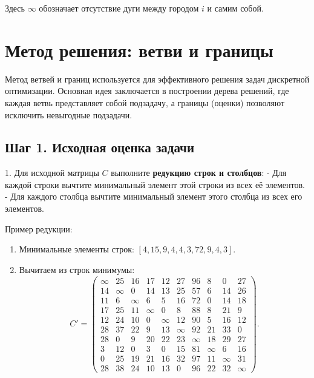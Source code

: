 \documentclass{article}
\begin{document}
Здесь $\infty$ обозначает отсутствие дуги между городом $i$ и самим собой.

\section*{Метод решения: ветви и границы}

Метод ветвей и границ используется для эффективного решения задач дискретной оптимизации. Основная идея заключается в построении дерева решений, где каждая ветвь представляет собой подзадачу, а границы (оценки) позволяют исключить невыгодные подзадачи.

\subsection*{Шаг 1. Исходная оценка задачи}

1. Для исходной матрицы $C$ выполните \textbf{редукцию строк и столбцов}:
- Для каждой строки вычтите минимальный элемент этой строки из всех её элементов.
- Для каждого столбца вычтите минимальный элемент этого столбца из всех его элементов.

Пример редукции:
\begin{enumerate}
    \item Минимальные элементы строк: $[4, 15, 9, 4, 4, 3, 72, 9, 4, 3]$.
    \item Вычитаем из строк минимумы:
          \[
              C' = \begin{pmatrix}
                  \infty & 25     & 16     & 17     & 12     & 27     & 96     & 8      & 0      & 27     \\
                  14     & \infty & 0      & 14     & 13     & 25     & 57     & 6      & 14     & 26     \\
                  11     & 6      & \infty & 6      & 5      & 16     & 72     & 0      & 14     & 18     \\
                  17     & 25     & 11     & \infty & 0      & 8      & 88     & 8      & 21     & 9      \\
                  12     & 24     & 10     & 0      & \infty & 12     & 90     & 5      & 16     & 12     \\
                  28     & 37     & 22     & 9      & 13     & \infty & 92     & 21     & 33     & 0      \\
                  28     & 0      & 9      & 20     & 22     & 23     & \infty & 18     & 29     & 27     \\
                  3      & 12     & 0      & 3      & 0      & 15     & 81     & \infty & 6      & 16     \\
                  0      & 25     & 19     & 21     & 16     & 32     & 97     & 11     & \infty & 31     \\
                  28     & 38     & 24     & 10     & 13     & 0      & 96     & 22     & 32     & \infty
              \end{pmatrix}.
          \]
\end{enumerate}
\end{document}
